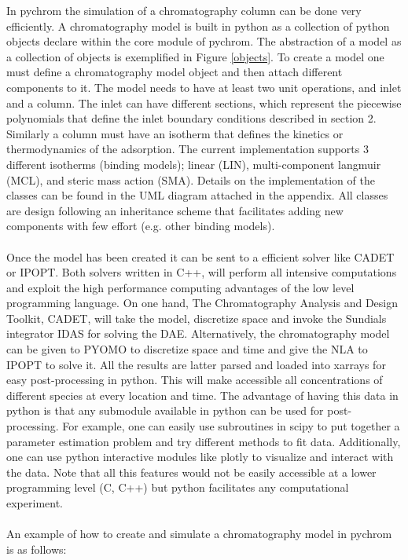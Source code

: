 \documentclass[paper=a4, fontsize=11pt]{scrartcl}
\begin{document}
In pychrom the simulation of a chromatography column can be done very efficiently. A chromatography model is built in python as a collection of python objects declare within the core module of pychrom. The abstraction of a model as a collection of objects is exemplified in Figure \ref{objects}. To create a model one must define a chromatography model object and then attach different components to it. The model needs to have at least two unit operations, and inlet and a column. The inlet can have different sections, which represent the piecewise polynomials that define the inlet boundary conditions described in section 2. Similarly a column must have an isotherm that defines the kinetics or thermodynamics of the adsorption. The current implementation supports 3 different isotherms (binding models); linear (LIN), multi-component langmuir (MCL), and steric mass action (SMA). Details on the implementation of the classes can be found in the UML diagram attached in the appendix. All classes are design following an inheritance scheme that facilitates adding new components with few effort (e.g. other binding models).  
\\
\\
Once the model has been created it can be sent to a efficient solver like CADET or IPOPT. Both solvers written in C++, will perform all intensive computations and exploit the high performance computing advantages of the low level programming language. On one hand, The Chromatography Analysis and Design Toolkit, CADET, will take the model, discretize space and invoke the Sundials integrator IDAS for solving the DAE. Alternatively, the chromatography model can be given to PYOMO to discretize space and time and give the NLA to IPOPT to solve it. All the results are latter parsed and loaded into xarrays for easy post-processing in python. This will make accessible all concentrations of different species at every location and time. The advantage of having this data in python is that any submodule available in python can be used for post-processing. For example, one can easily use subroutines in scipy to put together a parameter estimation problem and try different methods to fit data. Additionally, one can use python interactive modules like plotly to visualize and interact with the data. Note that all this features would not be easily accessible at a lower programming level (C, C++) but python facilitates any computational experiment. 
\\
\\
An example of how to create and simulate a chromatography model in pychrom is as follows:
\end{document}
